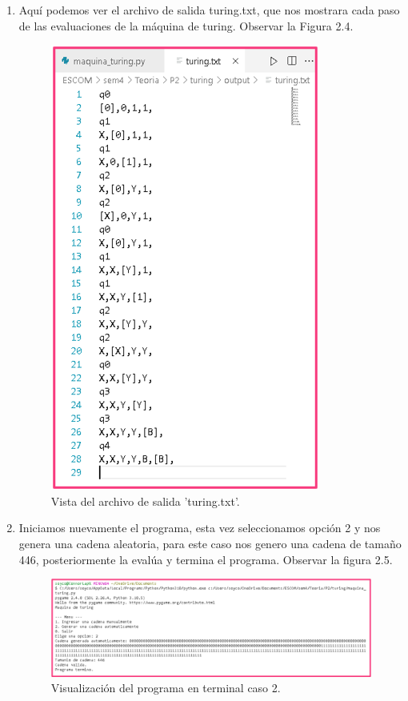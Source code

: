 \begin{enumerate}
\newpage
\item Aquí podemos ver el archivo de salida turing.txt, que nos mostrara cada paso de las evaluaciones de la máquina de turing. Observar la Figura 2.4.
\begin{figure}[h]
    \begin{center}
    \includegraphics[width=0.5\linewidth]{Images/Cap3.png}
    \end{center}
\caption{Vista del archivo de salida 'turing.txt'.}
\label{fig:imagen}
\end{figure}

\newpage
\item Iniciamos nuevamente el programa, esta vez seleccionamos opción 2 y nos genera una cadena aleatoria, para este caso nos genero una cadena de tamaño 446, posteriormente la evalúa y termina el programa. Observar la figura 2.5.

\begin{figure}[h]
    \begin{center}
    \includegraphics[width=1\linewidth]{Images/Cap4.png}
    \end{center}
\caption{Visualización del programa en terminal caso 2.}
\label{fig:imagen}
\end{figure}


\end{enumerate}
